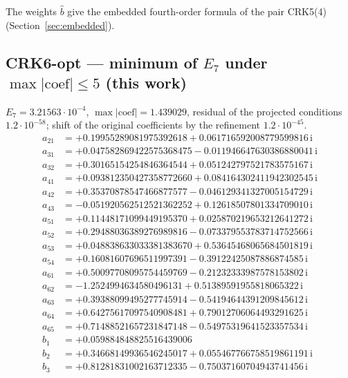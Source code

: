 The weights $\hat b$ give the embedded fourth-order formula of the pair CRK5(4) (Section~\ref{sec:embedded}).
\subsection*{CRK6-opt --- minimum of $E_7$ under $\max|\text{coef}|\le5$ (this work)}
$E_{7}=3.21563\cdot10^{-4}$, $\max|\text{coef}|=1.439029$, residual of the projected conditions $1.2\cdot10^{-58}$; shift of the original coefficients by the refinement $1.2\cdot10^{-45}$. 
{\small\allowdisplaybreaks
\begin{align*}
a_{21} &= +0.19955289081975392618 + 0.061716592008779599816\,\mathrm{i}\\
a_{31} &= +0.047582869422575368475 - 0.011946647630386880041\,\mathrm{i}\\
a_{32} &= +0.30165154254846364544 + 0.051242797521783575167\,\mathrm{i}\\
a_{41} &= +0.093812350427358772660 + 0.084164302411942302545\,\mathrm{i}\\
a_{42} &= +0.35370878547466877577 - 0.046129341327005154729\,\mathrm{i}\\
a_{43} &= -0.051920562512521362252 + 0.12618507801334709010\,\mathrm{i}\\
a_{51} &= +0.11448171099449195370 + 0.025870219653212641272\,\mathrm{i}\\
a_{52} &= +0.29488036389276989816 - 0.073379553783714752566\,\mathrm{i}\\
a_{53} &= +0.048838633033381383670 + 0.53645468065684501819\,\mathrm{i}\\
a_{54} &= +0.16081607696511997391 - 0.39122425087886874585\,\mathrm{i}\\
a_{61} &= +0.50097708095754459769 - 0.21232333987578153802\,\mathrm{i}\\
a_{62} &= -1.2524994634580496131 + 0.51389591955818065322\,\mathrm{i}\\
a_{63} &= +0.39388099495277745914 - 0.54194644391209845612\,\mathrm{i}\\
a_{64} &= +0.64275617097540908481 + 0.79012706064493291625\,\mathrm{i}\\
a_{65} &= +0.71488521657231847148 - 0.54975319641523357534\,\mathrm{i}\\[1mm]
b_{1} &= +0.059884848825516439006\\
b_{2} &= +0.34668149936546245017 + 0.055467766758519861191\,\mathrm{i}\\
b_{3} &= +0.81281831002163712335 - 0.75037160704943741456\,\mathrm{i}\\

\end{align*}}

